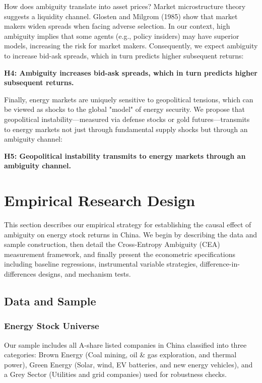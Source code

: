 \documentclass[preprint,12pt,authoryear]{elsarticle}
\begin{document}
How does ambiguity translate into asset prices? Market microstructure theory suggests a liquidity channel. Glosten and Milgrom (1985) show that market makers widen spreads when facing adverse selection. In our context, high ambiguity implies that some agents (e.g., policy insiders) may have superior models, increasing the risk for market makers. Consequently, we expect ambiguity to increase bid-ask spreads, which in turn predicts higher subsequent returns:

\noindent
\textbf{H4: Ambiguity increases bid-ask spreads, which in turn predicts higher subsequent returns.}

Finally, energy markets are uniquely sensitive to geopolitical tensions, which can be viewed as shocks to the global "model" of energy security. We propose that geopolitical instability—measured via defense stocks or gold futures—transmits to energy markets not just through fundamental supply shocks but through an ambiguity channel:

\noindent
\textbf{H5: Geopolitical instability transmits to energy markets through an ambiguity channel.}

\section{Empirical Research Design}

This section describes our empirical strategy for establishing the causal effect of ambiguity on energy stock returns in China. We begin by describing the data and sample construction, then detail the Cross-Entropy Ambiguity (CEA) measurement framework, and finally present the econometric specifications including baseline regressions, instrumental variable strategies, difference-in-differences designs, and mechanism tests.

\subsection{Data and Sample}

\subsubsection{Energy Stock Universe}

Our sample includes all A-share listed companies in China classified into three categories: Brown Energy (Coal mining, oil \& gas exploration, and thermal power), Green Energy (Solar, wind, EV batteries, and new energy vehicles), and a Grey Sector (Utilities and grid companies) used for robustness checks.
\end{document}
